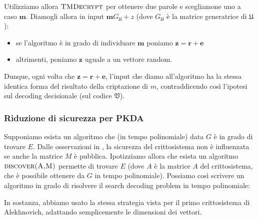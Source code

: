 \documentclass[12pt, a4paper]{report}
\theoremstyle{definition}
\begin{document}
				Utilizziamo allora $\textsc{TMDecrypt}$ per ottenere due parole e scegliamone uno a caso $\textbf{m}$. Diamogli allora in input $\textbf{m}G_\mathfrak{U}+z$ (dove $G_\mathfrak{U}$ è la matrice generatrice di $\mathfrak{U}$):
				\begin{itemize}
					\item se l'algoritmo è in grado di individuare $\textbf{m}$ poniamo $\textbf{z}=\textbf{r}+\textbf{e}$
					\item altrimenti, poniamo $\textbf{z}$ uguale a un vettore random.
				\end{itemize}
				Dunque, ogni volta che $\textbf{z}=\textbf{r}+\textbf{e}$, l'input che diamo all'algoritmo ha la stessa identica forma del risultato della criptazione di $m$, contraddicendo così l'ipotesi sul decoding decisionale (sul codice $\mathfrak{V}$).
			\subsubsection{Riduzione di sicurezza per PKDA}
				Supponiamo esista un algoritmo che (in tempo polinomiale) data $G$ è in grado di trovare $E$. Dalle osservazioni in \cite{9}, la sicurezza del crittosistema non è influenzata se anche la matrice $M$ è pubblica. Ipotizziamo allora che esista un algoritmo $\textsc{discover(A,M)}$ permette di trovare $E$ (dove $A$ è la matrice $A$ del crittosistema, che è possibile ottenere da $G$ in tempo polinomiale). Possiamo così scrivere un algoritmo in grado di risolvere il search decoding problem in tempo polinomiale:
				\algSix
				
				In sostanza, abbiamo usato la stessa strategia vista per il primo crittosistema di Alekhnovich, adattando semplicemente le dimensioni dei vettori.
		
\end{document}
